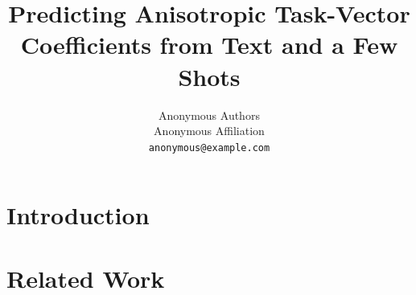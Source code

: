 \documentclass{article}
\title{Predicting Anisotropic Task-Vector Coefficients from Text and a Few Shots}
\author{%
  Anonymous Authors \\
  Anonymous Affiliation \\
  \texttt{anonymous@example.com}
}
\begin{document}
\maketitle

\begin{abstract}
\end{abstract}

\section{Introduction}

\section{Related Work}
\end{document}
